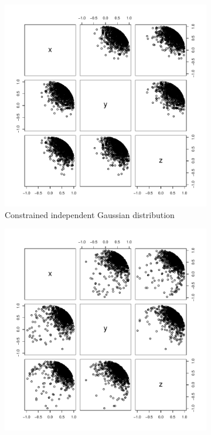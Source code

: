 \documentclass[10pt,fleqn]{article}
\DeclareMathOperator{\1}{\mathbbm{1}}
\begin{document}
\begin{figure}[H]
\begin{subfigure}[b]{0.45\textwidth}
\includegraphics[width=1\textwidth]{sphere_vmf}
\caption{Constrained independent Gaussian distribution}
\end{subfigure}
\begin{subfigure}[b]{0.45\textwidth}
\includegraphics[width=1\textwidth]{sphere_t}

\end{subfigure}
\end{figure}
\end{document}

